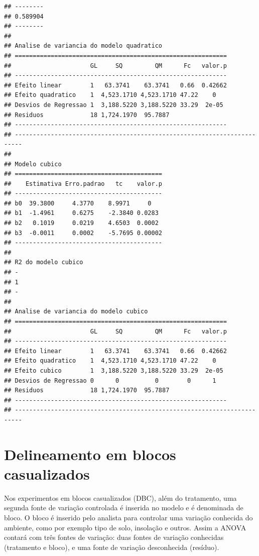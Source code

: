 \documentclass[
]{article}
\begin{document}
\begin{verbatim}
## --------
## 0.589904
## --------
## 
## Analise de variancia do modelo quadratico
## ===========================================================
##                      GL     SQ         QM      Fc   valor.p
## -----------------------------------------------------------
## Efeito linear        1   63.3741    63.3741   0.66  0.42662
## Efeito quadratico    1  4,523.1710 4,523.1710 47.22    0   
## Desvios de Regressao 1  3,188.5220 3,188.5220 33.29  2e-05 
## Residuos             18 1,724.1970  95.7887                
## -----------------------------------------------------------
## ------------------------------------------------------------------------
## 
## Modelo cubico
## =========================================
##    Estimativa Erro.padrao   tc    valor.p
## -----------------------------------------
## b0  39.3800     4.3770    8.9971     0   
## b1  -1.4961     0.6275    -2.3840 0.0283 
## b2   0.1019     0.0219    4.6503  0.0002 
## b3  -0.0011     0.0002    -5.7695 0.00002
## -----------------------------------------
## 
## R2 do modelo cubico
## -
## 1
## -
## 
## Analise de variancia do modelo cubico
## ===========================================================
##                      GL     SQ         QM      Fc   valor.p
## -----------------------------------------------------------
## Efeito linear        1   63.3741    63.3741   0.66  0.42662
## Efeito quadratico    1  4,523.1710 4,523.1710 47.22    0   
## Efeito cubico        1  3,188.5220 3,188.5220 33.29  2e-05 
## Desvios de Regressao 0      0          0        0      1   
## Residuos             18 1,724.1970  95.7887                
## -----------------------------------------------------------
## ------------------------------------------------------------------------
\end{verbatim}

\hypertarget{delineamento-em-blocos-casualizados}{%
\section{Delineamento em blocos casualizados}\label{delineamento-em-blocos-casualizados}}

Nos experimentos em blocos casualizados (DBC), além do tratamento, uma segunda fonte de variação controlada é inserida no modelo e é denominada de bloco. O bloco é inserido pelo analista para controlar uma variação conhecida do ambiente, como por exemplo tipo de solo, insolação e outros. Assim a ANOVA contará com três fontes de variação: duas fontes de variação conhecidas (tratamento e bloco), e uma fonte de variação desconhecida (resíduo).
\end{document}
